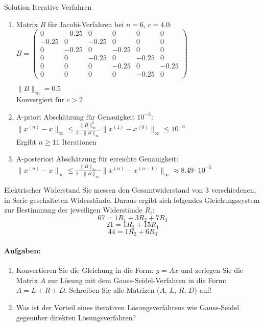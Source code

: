 \begin{KR}{Solution Iterative Verfahren}
\begin{enumerate}
    \item Matrix $B$ für Jacobi-Verfahren bei $n=6$, $c=4.0$:
    $B = \begin{pmatrix}
    0 & -0.25 & 0 & 0 & 0 & 0\\
    -0.25 & 0 & -0.25 & 0 & 0 & 0\\
    0 & -0.25 & 0 & -0.25 & 0 & 0\\
    0 & 0 & -0.25 & 0 & -0.25 & 0\\
    0 & 0 & 0 & -0.25 & 0 & -0.25\\
    0 & 0 & 0 & 0 & -0.25 & 0
    \end{pmatrix}$
    
    $\|B\|_\infty = 0.5$\\
    Konvergiert für $c > 2$
    
    \item A-priori Abschätzung für Genauigkeit $10^{-3}$:\\
    $\|x^{(n)} - x\|_\infty \leq \frac{\|B\|_\infty^n}{1-\|B\|_\infty}\|x^{(1)}-x^{(0)}\|_\infty \leq 10^{-3}$\\
    Ergibt $n \geq 11$ Iterationen
    
    \item A-posteriori Abschätzung für erreichte Genauigkeit:\\
    $\|x^{(n)} - x\|_\infty \leq \frac{\|B\|_\infty}{1-\|B\|_\infty}\|x^{(n)}-x^{(n-1)}\|_\infty \approx 8.49 \cdot 10^{-5}$
\end{enumerate}
\end{KR}

\begin{example2}{Elektrischer Widerstand}
Sie messen den Gesamtwiderstand von 3 verschiedenen, in Serie geschalteten Widerstände. Daraus ergibt sich folgendes Gleichungssystem zur Bestimmung der jeweiligen Widerstände $R_i$:
$$67 = 1R_1 + 3R_2 + 7R_3$$
$$21 = 1R_3 + 15R_1$$
$$44 = 1R_2 + 6R_3$$

\paragraph{Aufgaben:}
\begin{enumerate}
    \item Konvertieren Sie die Gleichung in die Form: $y = Ax$ und zerlegen Sie die Matrix $A$ zur Lösung mit dem Gauss-Seidel-Verfahren in die Form: $A = L + R + D$. Schreiben Sie alle Matrizen ($A$, $L$, $R$, $D$) auf!
        
    \item Was ist der Vorteil eines iterativen Lösungsverfahrens wie Gauss-Seidel gegenüber direkten Lösungsverfahren?
\end{enumerate}
\end{example2}


